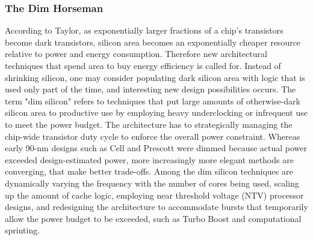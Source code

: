 

\subsubsection{The Dim Horseman}
According to Taylor\cite{dark-silicon}, as exponentially larger fractions of a chip’s transistors become dark transistors, silicon area becomes an exponentially cheaper resource relative to power and energy consumption.
Therefore new architectural techniques that spend area to buy energy efficiency is called for.
Instead of shrinking silicon, one may consider populating dark silicon area with logic that is used only part of the time, and interesting new design possibilities occurs.
The term "dim silicon" refers to techniques that put large amounts of otherwise-dark silicon area to productive use by employing heavy underclocking or infrequent use to meet the power budget.
The architecture has to strategically managing the chip-wide transistor duty cycle to enforce the overall power constraint. 
Whereas early 90-nm designs such as Cell and Prescott were dimmed because actual power exceeded design-estimated power, more increasingly more elegant methods are converging, that make better trade-offs.
Among the dim silicon techniques are dynamically varying the frequency with the number of cores being used, scaling up the amount of cache logic, employing near threshold voltage (NTV) processor designs, and redesigning the architecture to accommodate bursts that temporarily allow the power budget to be exceeded, such as Turbo Boost and computational sprinting.


